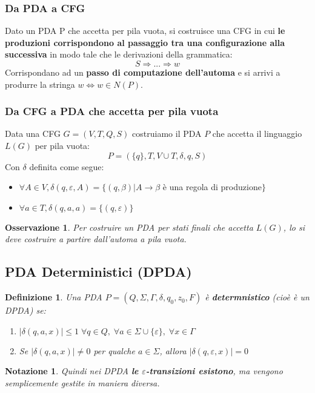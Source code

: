 \documentclass[12pt]{article}
\newtheorem{Definizione}{Definizione}[subsection]
\newtheorem{Notazione}{Notazione}[subsection]
\newtheorem{Osservazione}{Osservazione}[subsection]
\begin{document}
\subsubsection{Da PDA a CFG}
Dato un PDA P che accetta per pila vuota, si costruisce una CFG in cui \textbf{le produzioni corrispondono al passaggio tra una configurazione alla successiva} in modo tale che le derivazioni della grammatica:
$$S \Rightarrow ... \Rightarrow w$$
Corrispondano ad un \textbf{passo di computazione dell'automa} e si arrivi a produrre la stringa $w \Leftrightarrow w \in N(P)$. 
\subsubsection{Da CFG a PDA che accetta per pila vuota}
Data una CFG $G = (V, T, Q, S)$ costruiamo il PDA $P$ che accetta il linguaggio $L(G)$ per pila vuota:
$$P = (\{q\}, T, V \cup T, \delta, q, S)$$
Con $\delta$ definita come segue:
\begin{itemize}
    \item $\forall A \in V, \delta(q, \varepsilon, A) = \{(q, \beta)|A \rightarrow \beta$ è una regola di produzione$\}$
    \item $\forall a \in T, \delta(q, a, a) = \{(q, \varepsilon)\}$
\end{itemize}
\begin{Osservazione}
    Per costruire un PDA per stati finali che accetta $L(G)$, lo si deve costruire a partire dall'automa a pila vuota.
\end{Osservazione}

\subsection{PDA Deterministici (DPDA)}
\begin{Definizione}
    Una PDA $P = (Q, \Sigma, \Gamma, \delta, q_0, z_0, F)$ è \textbf{determnistico} (cioè è un DPDA) se:
    \begin{enumerate}
        \item $|\delta(q, a, x)| \leq 1 \; \forall q \in Q, \; \forall a \in \Sigma \cup \{\varepsilon\}, 
        \; \forall x \in \Gamma$
        \item Se $|\delta(q, a, x)| \neq 0$ per qualche $a \in \Sigma$, allora $|\delta(q, \varepsilon, x)| = 0$
    \end{enumerate}
\end{Definizione}
\begin{Notazione}
    Quindi nei DPDA \textbf{le $\varepsilon$-transizioni esistono}, ma vengono semplicemente gestite in maniera diversa.
\end{Notazione}
\end{document}
